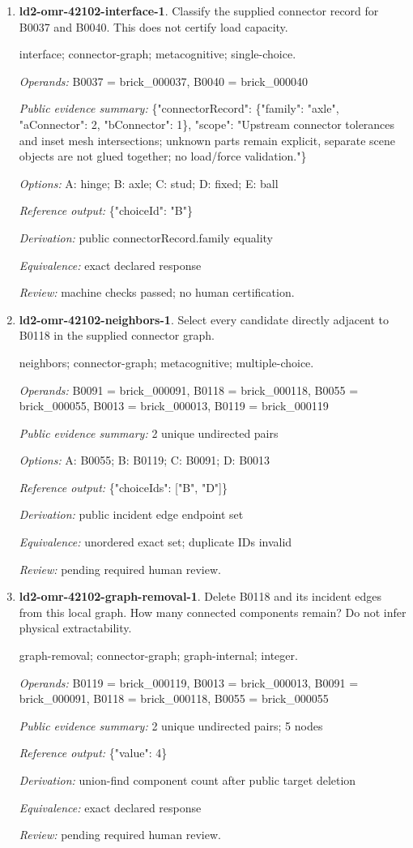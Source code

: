 \begin{enumerate}
\item \textbf{ld2-omr-42102-interface-1}. Classify the supplied connector record for B0037 and B0040. This does not certify load capacity.
\par{\small interface; connector-graph; metacognitive; single-choice.\par\textit{Operands:} B0037 = brick\_000037, B0040 = brick\_000040\par\textit{Public evidence summary:} \{"connectorRecord": \{"family": "axle", "aConnector": 2, "bConnector": 1\}, "scope": "Upstream connector tolerances and inset mesh intersections; unknown parts remain explicit, separate scene objects are not glued together; no load/force validation."\}\par\textit{Options:} A: hinge; B: axle; C: stud; D: fixed; E: ball\par\textit{Reference output:} \{"choiceId": "B"\}\par\textit{Derivation:} public connectorRecord.family equality\par\textit{Equivalence:} exact declared response\par\textit{Review:} machine checks passed; no human certification.}
\item \textbf{ld2-omr-42102-neighbors-1}. Select every candidate directly adjacent to B0118 in the supplied connector graph.
\par{\small neighbors; connector-graph; metacognitive; multiple-choice.\par\textit{Operands:} B0091 = brick\_000091, B0118 = brick\_000118, B0055 = brick\_000055, B0013 = brick\_000013, B0119 = brick\_000119\par\textit{Public evidence summary:} 2 unique undirected pairs\par\textit{Options:} A: B0055; B: B0119; C: B0091; D: B0013\par\textit{Reference output:} \{"choiceIds": ["B", "D"]\}\par\textit{Derivation:} public incident edge endpoint set\par\textit{Equivalence:} unordered exact set; duplicate IDs invalid\par\textit{Review:} pending required human review.}
\item \textbf{ld2-omr-42102-graph-removal-1}. Delete B0118 and its incident edges from this local graph. How many connected components remain? Do not infer physical extractability.
\par{\small graph-removal; connector-graph; graph-internal; integer.\par\textit{Operands:} B0119 = brick\_000119, B0013 = brick\_000013, B0091 = brick\_000091, B0118 = brick\_000118, B0055 = brick\_000055\par\textit{Public evidence summary:} 2 unique undirected pairs; 5 nodes\par\textit{Reference output:} \{"value": 4\}\par\textit{Derivation:} union-find component count after public target deletion\par\textit{Equivalence:} exact declared response\par\textit{Review:} pending required human review.}

\end{enumerate}
